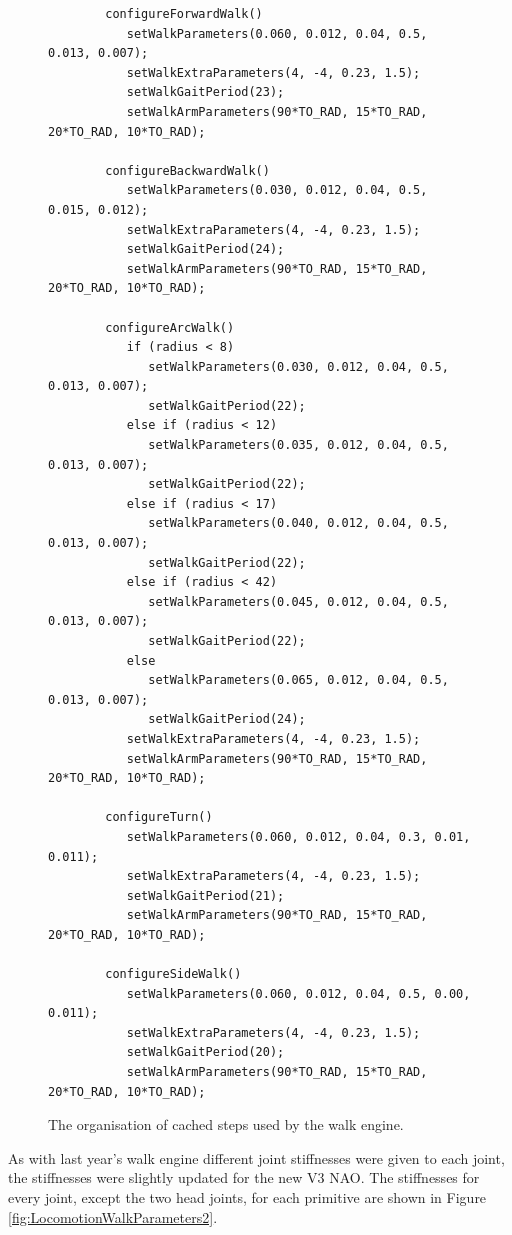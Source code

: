 \begin{figure}
	\begin{center}
		{\scriptsize\begin{verbatim}
		configureForwardWalk()
		   setWalkParameters(0.060, 0.012, 0.04, 0.5, 0.013, 0.007);
		   setWalkExtraParameters(4, -4, 0.23, 1.5);
		   setWalkGaitPeriod(23);
		   setWalkArmParameters(90*TO_RAD, 15*TO_RAD, 20*TO_RAD, 10*TO_RAD);

		configureBackwardWalk()
		   setWalkParameters(0.030, 0.012, 0.04, 0.5, 0.015, 0.012);
		   setWalkExtraParameters(4, -4, 0.23, 1.5);
		   setWalkGaitPeriod(24);
		   setWalkArmParameters(90*TO_RAD, 15*TO_RAD, 20*TO_RAD, 10*TO_RAD);

		configureArcWalk()
		   if (radius < 8)
		      setWalkParameters(0.030, 0.012, 0.04, 0.5, 0.013, 0.007);
		      setWalkGaitPeriod(22);
		   else if (radius < 12)
		      setWalkParameters(0.035, 0.012, 0.04, 0.5, 0.013, 0.007);
		      setWalkGaitPeriod(22);
		   else if (radius < 17)
		      setWalkParameters(0.040, 0.012, 0.04, 0.5, 0.013, 0.007);
		      setWalkGaitPeriod(22);
		   else if (radius < 42)
		      setWalkParameters(0.045, 0.012, 0.04, 0.5, 0.013, 0.007);
		      setWalkGaitPeriod(22);
		   else
		      setWalkParameters(0.065, 0.012, 0.04, 0.5, 0.013, 0.007);
		      setWalkGaitPeriod(24);
		   setWalkExtraParameters(4, -4, 0.23, 1.5);
		   setWalkArmParameters(90*TO_RAD, 15*TO_RAD, 20*TO_RAD, 10*TO_RAD);

		configureTurn()
		   setWalkParameters(0.060, 0.012, 0.04, 0.3, 0.01, 0.011);
		   setWalkExtraParameters(4, -4, 0.23, 1.5);
		   setWalkGaitPeriod(21);
		   setWalkArmParameters(90*TO_RAD, 15*TO_RAD, 20*TO_RAD, 10*TO_RAD);

		configureSideWalk()
		   setWalkParameters(0.060, 0.012, 0.04, 0.5, 0.00, 0.011);
		   setWalkExtraParameters(4, -4, 0.23, 1.5);
		   setWalkGaitPeriod(20);
		   setWalkArmParameters(90*TO_RAD, 15*TO_RAD, 20*TO_RAD, 10*TO_RAD);
		\end{verbatim}}
		\caption{The organisation of cached steps used by the walk engine.}
		\label{fig:LocomotionWalkParameters}
	\end{center}
\end{figure}

As with last year's walk engine \cite{JasonsAcraPaper} different joint stiffnesses were given to each joint, the stiffnesses were slightly updated for the new V3 NAO. The stiffnesses for every joint, except the two head joints, for each primitive are shown in Figure \ref{fig:LocomotionWalkParameters2}.

